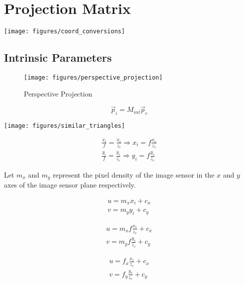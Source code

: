 \section{Projection Matrix}


\texttt{[image: figures/coord\_conversions]}


\subsection{Intrinsic Parameters}

\begin{figure}[h!]
    \centering
    \texttt{[image: figures/perspective\_projection]}
    \caption{Perspective Projection}
\end{figure}

\begin{equation}
    \vec{p}_i = M_{int} \vec{p}_c
\end{equation}

\texttt{[image: figures/similar\_triangles]}

\begin{gather}
    \frac{x_i}{f} = \frac{x_c}{z_c} \Rightarrow x_i = f \frac{x_c}{z_c} \\
    \frac{y_i}{f} = \frac{y_c}{z_c} \Rightarrow y_i = f \frac{y_c}{z_c}
\end{gather}


Let $m_x$ and $m_y$ represent the pixel density of the image sensor in the $x$ and $y$ axes of the image sensor plane respectively.


\begin{gather}
    u = m_x x_i + c_x \\
    v = m_y y_i + c_y
\end{gather}

\begin{gather}
    u = m_x f \frac{x_c}{z_c} + c_x \\
    v = m_y f \frac{y_c}{z_c} + c_y
\end{gather}

\begin{gather}
    u = f_x \frac{x_c}{z_c} + c_x \\
    v = f_y \frac{y_c}{z_c} + c_y
\end{gather}

